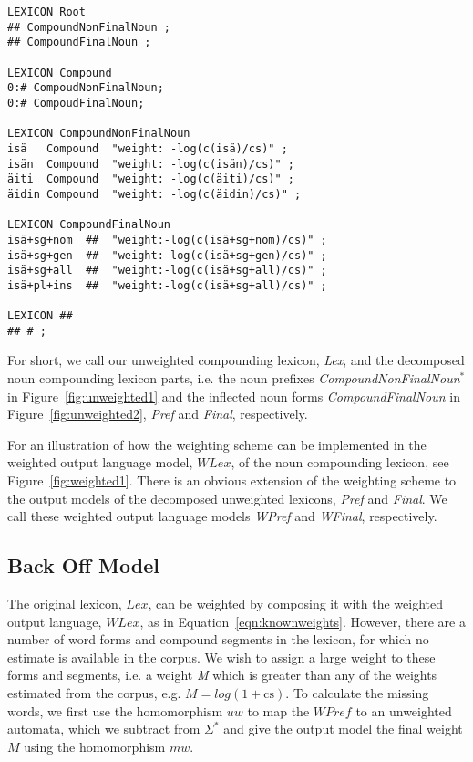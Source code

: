 \documentclass[a4paper]{article}
\begin{document}
\begin{figure*}[h!]
  \centering
  \begin{scriptsize}
\begin{verbatim}
LEXICON Root
## CompoundNonFinalNoun ;
## CompoundFinalNoun ;

LEXICON Compound
0:# CompoudNonFinalNoun;
0:# CompoudFinalNoun;

LEXICON CompoundNonFinalNoun
isä   Compound  "weight: -log(c(isä)/cs)" ;
isän  Compound  "weight: -log(c(isän)/cs)" ;
äiti  Compound  "weight: -log(c(äiti)/cs)" ;
äidin Compound  "weight: -log(c(äidin)/cs)" ;

LEXICON CompoundFinalNoun
isä+sg+nom  ##  "weight:-log(c(isä+sg+nom)/cs)" ;
isä+sg+gen  ##  "weight:-log(c(isä+sg+gen)/cs)" ;
isä+sg+all  ##  "weight:-log(c(isä+sg+all)/cs)" ;
isä+pl+ins  ##  "weight:-log(c(isä+sg+all)/cs)" ;

LEXICON ##
## # ;
\end{verbatim}
  \end{scriptsize}
  \caption{Structure weighting scheme using token penalties on the
    output language. Note that the functions in the comment field are
    placeholders for the actual weights.}\label{fig:weighted1}
\end{figure*}

For short, we call our unweighted compounding lexicon, \emph{Lex}, and
the decomposed noun compounding lexicon parts, i.e. the noun prefixes
\emph{CompoundNonFinalNoun}$^*$ in Figure~\ref{fig:unweighted1} and
the inflected noun forms \emph{CompoundFinalNoun} in
Figure~\ref{fig:unweighted2}, \emph{Pref} and \emph{Final},
respectively.

For an illustration of how the weighting scheme can be implemented in
the weighted output language model, $WLex$, of the noun compounding
lexicon, see Figure~\ref{fig:weighted1}. There is an obvious extension
of the weighting scheme to the output models of the decomposed
unweighted lexicons, \emph{Pref} and \emph{Final}. We call these
weighted output language models \emph{WPref} and \emph{WFinal},
respectively.

\subsection{Back Off Model}

The original lexicon, $Lex$, can be weighted by composing it with the
weighted output language, $WLex$, as in
Equation~\ref{eqn:knownweights}. However, there are a number of word
forms and compound segments in the lexicon, for which no estimate is
available in the corpus. We wish to assign a large weight to these
forms and segments, i.e. a weight \emph{M} which is greater than any
of the weights estimated from the corpus, e.g. $M =
log(1+\mathrm{cs})$. To calculate the missing words, we first use the
homomorphism $uw$ to map the $WPref$ to an unweighted automata, which we
subtract from $\Sigma^*$ and give the output model the final weight
$M$ using the homomorphism $mw$.
\end{document}
